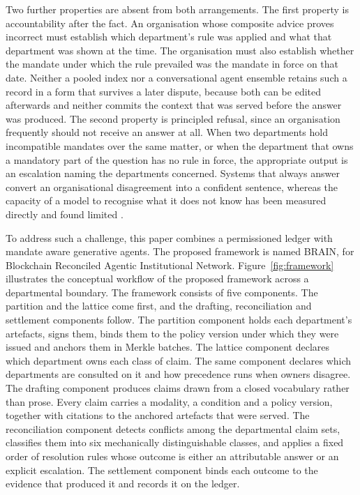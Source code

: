 \documentclass[journal]{IEEEtran}
\begin{document}
Two further properties are absent from both arrangements. The first property is accountability after the fact. An organisation whose composite advice proves incorrect must establish which department's rule was applied and what that department was shown at the time. The organisation must also establish whether the mandate under which the rule prevailed was the mandate in force on that date. Neither a pooled index nor a conversational agent ensemble retains such a record in a form that survives a later dispute, because both can be edited afterwards and neither commits the context that was served before the answer was produced. The second property is principled refusal, since an organisation frequently should not receive an answer at all. When two departments hold incompatible mandates over the same matter, or when the department that owns a mandatory part of the question has no rule in force, the appropriate output is an escalation naming the departments concerned. Systems that always answer convert an organisational disagreement into a confident sentence, whereas the capacity of a model to recognise what it does not know has been measured directly and found limited \cite{yin2023knowunknown,kamath2020selective}.

To address such a challenge, this paper combines a permissioned ledger with mandate aware generative agents. The proposed framework is named BRAIN, for Blockchain Reconciled Agentic Institutional Network. Figure~\ref{fig:framework} illustrates the conceptual workflow of the proposed framework across a departmental boundary. The framework consists of five components. The partition and the lattice come first, and the drafting, reconciliation and settlement components follow. The partition component holds each department's artefacts, signs them, binds them to the policy version under which they were issued and anchors them in Merkle batches. The lattice component declares which department owns each class of claim. The same component declares which departments are consulted on it and how precedence runs when owners disagree. The drafting component produces claims drawn from a closed vocabulary rather than prose. Every claim carries a modality, a condition and a policy version, together with citations to the anchored artefacts that were served. The reconciliation component detects conflicts among the departmental claim sets, classifies them into six mechanically distinguishable classes, and applies a fixed order of resolution rules whose outcome is either an attributable answer or an explicit escalation. The settlement component binds each outcome to the evidence that produced it and records it on the ledger.
\end{document}
